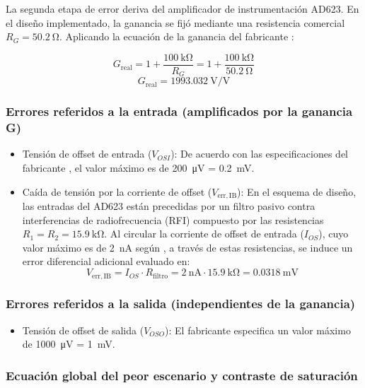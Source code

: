 La segunda etapa de error deriva del amplificador de instrumentación AD623. En el diseño implementado, la ganancia se fijó mediante una resistencia comercial $R_{G} = \SI{50.2}{\ohm}$. Aplicando la ecuación de la ganancia del fabricante \cite{ad623_datasheet}:

$$G_{\mathrm{real}} = 1 + \frac{\SI{100}{\kilo\ohm}}{R_G} = 1 + \frac{\SI{100}{\kilo\ohm}}{\SI{50.2}{\ohm}}$$
$$G_{\mathrm{real}} = \SI{1993.032}{\V\per\V}$$

\subsubsection{Errores referidos a la entrada (amplificados por la ganancia G)}

\begin{itemize}
    \item Tensión de offset de entrada ($V_{OSI}$): De acuerdo con las especificaciones del fabricante \cite{ad623_datasheet}, el valor máximo es de \SI{200}{\micro\V} = \SI{0.2}{\milli\V}.
    \item Caída de tensión por la corriente de offset ($V_{\mathrm{err,IB}}$): En el esquema de diseño, las entradas del AD623 están precedidas por un filtro pasivo contra interferencias de radiofrecuencia (RFI) compuesto por las resistencias $R_1 = R_2 = \SI{15.9}{\kilo\ohm}$. Al circular la corriente de offset de entrada ($I_{OS}$), cuyo valor máximo es de \SI{2}{\nano\A} según \cite{ad623_datasheet}, a través de estas resistencias, se induce un error diferencial adicional evaluado en:
          $$V_{\mathrm{err,IB}} = I_{OS} \cdot R_{\mathrm{filtro}} = \SI{2}{\nano\A} \cdot \SI{15.9}{\kilo\ohm}= \SI{0.0318}{\milli\V}$$
\end{itemize}

\subsubsection{Errores referidos a la salida (independientes de la ganancia)}

\begin{itemize}
    \item Tensión de offset de salida ($V_{OSO}$): El fabricante especifica un valor máximo de \SI{1000}{\micro\V} = \SI{1}{\milli\V}.
\end{itemize}

\subsubsection{Ecuación global del peor escenario y contraste de saturación}


